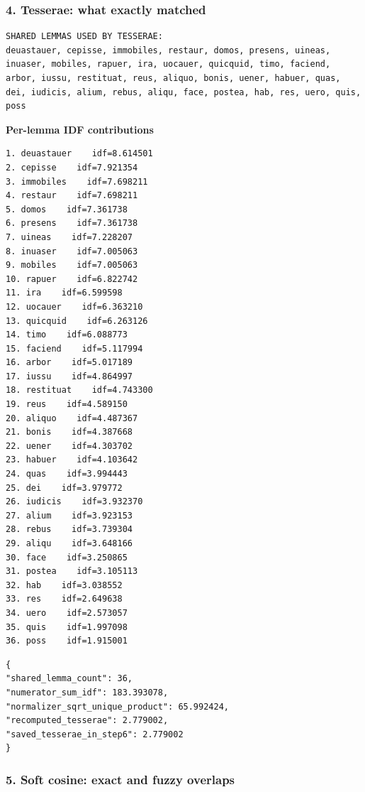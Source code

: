 \subsubsection{4. Tesserae: what exactly matched}

\begin{lstlisting}[breaklines=true,basicstyle=\ttfamily\small]
SHARED LEMMAS USED BY TESSERAE:
deuastauer, cepisse, immobiles, restaur, domos, presens, uineas, inuaser, mobiles, rapuer, ira, uocauer, quicquid, timo, faciend, arbor, iussu, restituat, reus, aliquo, bonis, uener, habuer, quas, dei, iudicis, alium, rebus, aliqu, face, postea, hab, res, uero, quis, poss
\end{lstlisting}

\textbf{Per-lemma IDF contributions} 

\begin{lstlisting}[breaklines=true,basicstyle=\ttfamily\small]
1. deuastauer    idf=8.614501
2. cepisse    idf=7.921354
3. immobiles    idf=7.698211
4. restaur    idf=7.698211
5. domos    idf=7.361738
6. presens    idf=7.361738
7. uineas    idf=7.228207
8. inuaser    idf=7.005063
9. mobiles    idf=7.005063
10. rapuer    idf=6.822742
11. ira    idf=6.599598
12. uocauer    idf=6.363210
13. quicquid    idf=6.263126
14. timo    idf=6.088773
15. faciend    idf=5.117994
16. arbor    idf=5.017189
17. iussu    idf=4.864997
18. restituat    idf=4.743300
19. reus    idf=4.589150
20. aliquo    idf=4.487367
21. bonis    idf=4.387668
22. uener    idf=4.303702
23. habuer    idf=4.103642
24. quas    idf=3.994443
25. dei    idf=3.979772
26. iudicis    idf=3.932370
27. alium    idf=3.923153
28. rebus    idf=3.739304
29. aliqu    idf=3.648166
30. face    idf=3.250865
31. postea    idf=3.105113
32. hab    idf=3.038552
33. res    idf=2.649638
34. uero    idf=2.573057
35. quis    idf=1.997098
36. poss    idf=1.915001
\end{lstlisting}

\begin{lstlisting}[breaklines=true,basicstyle=\ttfamily\small,language={}]
{
"shared_lemma_count": 36,
"numerator_sum_idf": 183.393078,
"normalizer_sqrt_unique_product": 65.992424,
"recomputed_tesserae": 2.779002,
"saved_tesserae_in_step6": 2.779002
}
\end{lstlisting}

\subsubsection{5. Soft cosine: exact and fuzzy overlaps}

